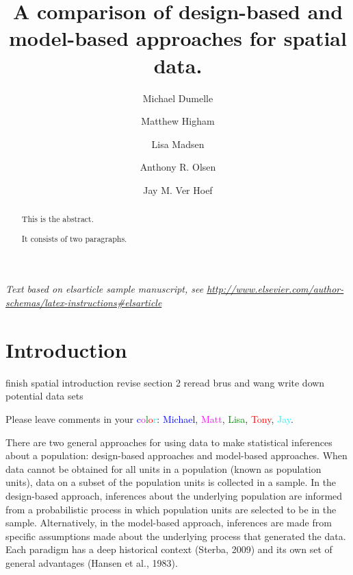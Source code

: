 \documentclass[]{elsarticle} %
\begin{document}
\begin{frontmatter}

  \title{A comparison of design-based and model-based approaches for
spatial data.}
    \author[USEPA]{Michael Dumelle}
    \author[STLAW]{Matthew Higham}
    \author[OSU]{Lisa Madsen}
  
    \author[USEPA]{Anthony R. Olsen}
  
    \author[NOAA]{Jay M. Ver Hoef}
  
      \address[USEPA]{United States Environmental Protection Agency, 200
SW 35th St, Corvallis, Oregon, 97333}
    \address[STLAW]{Saint Lawrence University Department of Math,
Computer Science, and Statistics, 23 Romoda Drive, Canton, New York,
13617}
    \address[OSU]{Oregon State University Department of Statistics, 239
Weniger Hall, Corvallis, Oregon, 97331}
    \address[NOAA]{Marine Mammal Laboratory, Alaska Fisheries Science
Center, National Oceanic and Atmospheric Administration, Seattle,
Washington, 98115}
  
  \begin{abstract}
  This is the abstract.

  It consists of two paragraphs.
  \end{abstract}
  
 \end{frontmatter}

\emph{Text based on elsarticle sample manuscript, see
\url{http://www.elsevier.com/author-schemas/latex-instructions\#elsarticle}}

\hypertarget{sec:introduction}{%
\section{Introduction}\label{sec:introduction}}

finish spatial introduction revise section 2 reread brus and wang write
down potential data sets

Please leave comments in your
\textcolor{blue}{c}\textcolor{magenta}{o}\textcolor{green}{l}\textcolor{red}{o}\textcolor{cyan}{r}:
\textcolor{blue}{Michael}, \textcolor{magenta}{Matt},
\textcolor{green}{Lisa}, \textcolor{red}{Tony}, \textcolor{cyan}{Jay}.

There are two general approaches for using data to make statistical
inferences about a population: design-based approaches and model-based
approaches. When data cannot be obtained for all units in a population
(known as population units), data on a subset of the population units is
collected in a sample. In the design-based approach, inferences about
the underlying population are informed from a probabilistic process in
which population units are selected to be in the sample. Alternatively,
in the model-based approach, inferences are made from specific
assumptions made about the underlying process that generated the data.
Each paradigm has a deep historical context (Sterba, 2009) and its own
set of general advantages (Hansen et al., 1983).
\end{document}
